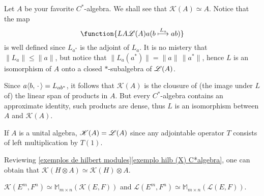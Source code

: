 \begin{exemplos}$\left.\right.$
    \label{exemplos: K( . )}
\begin{itroman}
    \item Let $A$ be your favorite $C^*$-algebra. We shall see that $\mathscr K(A) \simeq A$. Notice that the map 
    \begin{equation*}
        \function{{L}{A}{\adj(A)}{a}{
            (b \overset{L_a}\longmapsto ab)}}
    \end{equation*}
    is well defined since $L_{a^*}$ is the adjoint of $L_a$. It is no mistery that $\|L_a\| \leqslant \|a\|$, but notice that $\|L_a(a^*)\| = \|a\|\,\|a^*\|$, hence $L$ is an isomorphism of $A$ onto a closed $*$-subalgebra of $\mathscr L(A)$. \nocite{raeburn1998morita}
    
    Since $a\langle {b},{\operatorname{\,\cdot\,}}\rangle = L_{ab^*}$, it follows that $\mathscr K(A)$ is the clousure of (the image under $L$ of) the linear span of products in $A$. But every $C^*$-algebra contains an approximate identity, such products are dense, thus $L$ is an isomorphism between $A$ and $\mathscr K(A)$.   

    \item \label{exemplo item: K(A)=L(A) pra A unital} If $A$ is a unital algebra, $\mathscr K(A) = \mathscr L(A)$ since any adjointable operator $T$ consists of left multiplication by $T(1)$.
    
    \item Reviewing \ref{exemplos de hilbert modules}\ref{exemplo hilb (X) C*algebra}, one can obtain that $\mathscr K(H\otimes A) \simeq \mathscr K(H) \otimes A$. 
    
    \item $\mathscr K(E^m, F^n) \simeq \mathbb M_{m\times n}(\mathscr K(E, F))$ and $\mathscr L(E^m, F^n) \simeq \mathbb M_{m\times n}(\mathscr L(E, F))$.
    
\end{itroman}
\end{exemplos}

